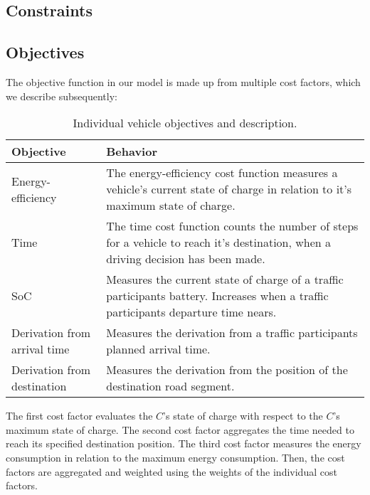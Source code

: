 \subsection{Constraints}


\subsection{Objectives}


The objective function in our model is made up from multiple cost factors, which we describe subsequently:

\begin{table}[h!]
	\centering
	\renewcommand{\arraystretch}{1.3}
	\begin{tabularx}{\columnwidth}{|Y|Y|}
		\hline
		
		\textbf{Objective} & \textbf{Behavior} \\
		
		\hline
		
		Energy-efficiency &
		The energy-efficiency cost function measures a vehicle's current state of charge in relation to it's maximum state of charge. \\
		
		\hline
		
		Time &
		The time cost function counts the number of steps for a vehicle to reach it's destination, when a driving decision has been made. \\
		
		\hline
		
		SoC &
		Measures the current state of charge of a traffic participants battery. Increases when a traffic participants departure time nears. \\
		
		\hline
		
		Derivation from arrival time &
		Measures the derivation from a traffic participants planned arrival time. \\
		
		\hline
		
		Derivation from destination &
		Measures the derivation from the position of the destination road segment. \\
		
		\hline			
	\end{tabularx}
	\caption{Individual vehicle objectives and description.}
	\label{figure:objectives}
\end{table}

The first cost factor evaluates the $C$'s state of charge with respect to the $C$'s maximum state of charge. The second cost factor aggregates the time needed to reach its specified destination position. The third cost factor measures the energy consumption in relation to the maximum energy consumption. Then, the cost factors are aggregated and weighted using the weights of the individual cost factors.
